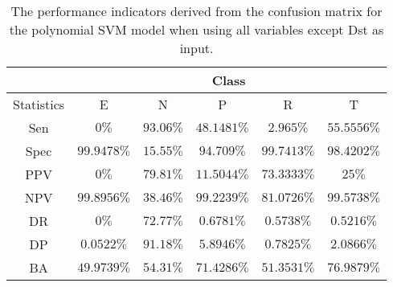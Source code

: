 \begin{table}[!ht]
	\centering
	\begin{tabular}{|c|c|c|c|c|c|}
		\hline
		 & \multicolumn{5}{c|}{Class} \\ \hline
		Statistics & E & N & P & R & T \\ \hline
		Sen & $0\%$ & $93.06\%$ & $48.1481\%$ & $2.965\%$ & $55.5556\%$ \\ \hline
		Spec & $99.9478\%$ & $15.55\%$ & $94.709\%$ & $99.7413\%$ & $98.4202\%$ \\ \hline
		PPV & $0\%$ & $79.81\%$ & $11.5044\%$ & $73.3333\%$ & $25\%$ \\ \hline
		NPV & $99.8956\%$ & $38.46\%$ & $99.2239\%$ & $81.0726\%$ & $99.5738\%$ \\ \hline
		DR & $0\%$ & $72.77\%$ & $0.6781\%$ & $0.5738\%$ & $0.5216\%$ \\ \hline
		DP & $0.0522\%$ & $91.18\%$ & $5.8946\%$ & $0.7825\%$ & $2.0866\%$ \\ \hline
		BA & $49.9739\%$ & $54.31\%$ & $71.4286\%$ & $51.3531\%$ & $76.9879\%$ \\ \hline
	\end{tabular}
	\caption{The performance indicators derived from the confusion matrix for the polynomial SVM model when using all variables except Dst as input.}
	\label{tab:cs:reverse:noDst:svmPoly}
\end{table}
